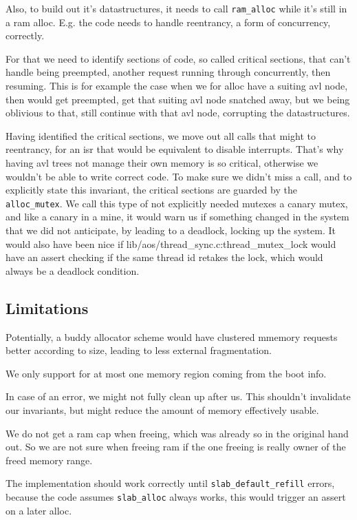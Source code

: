 Also, to build out it's datastructures, it needs to call \verb|ram_alloc| while
it's still in a ram alloc.
E.g. the code needs to handle reentrancy, a form of concurrency, correctly.

For that we need to identify sections of code, so called critical sections, that
can't handle being preempted, another request running through concurrently, then
resuming.
This is for example the case when we for alloc have a suiting avl node, then
would get preempted, get that suiting avl node snatched away, but we being
oblivious to that, still continue with that avl node, corrupting the
datastructures.

Having identified the critical sections, we move out all calls that might to
reentrancy, for an isr that would be equivalent to disable interrupts.
That's why having avl trees not manage their own memory is so critical,
otherwise we wouldn't be able to write correct code.
To make sure we didn't miss a call, and to explicitly state this invariant, the
critical sections are guarded by the \verb|alloc_mutex|.
We call this type of not explicitly needed mutexes a canary mutex, and like a
canary in a mine, it would warn us if something changed in the system that we
did not anticipate, by leading to a deadlock, locking up the system.
It would also have been nice if lib/aos/thread\_sync.c:thread\_mutex\_lock would
have an assert checking if the same thread id retakes the lock, which would
always be a deadlock condition.

% 
% 
% 

\subsection{Limitations}

Potentially, a buddy allocator scheme would have clustered mmemory requests
better according to size, leading to less external fragmentation.

We only support for at most one memory region coming from the boot info.

In case of an error, we might not fully clean up after us.
This shouldn't invalidate our invariants, but might reduce the amount of memory
effectively usable.

We do not get a ram cap when freeing, which was already so in the original hand
out.
So we are not sure when freeing ram if the one freeing is really owner of the
freed memory range.

The implementation should work correctly until \verb|slab_default_refill| errors,
because the code assumes \verb|slab_alloc| always works, this would trigger an
assert on a later alloc.
